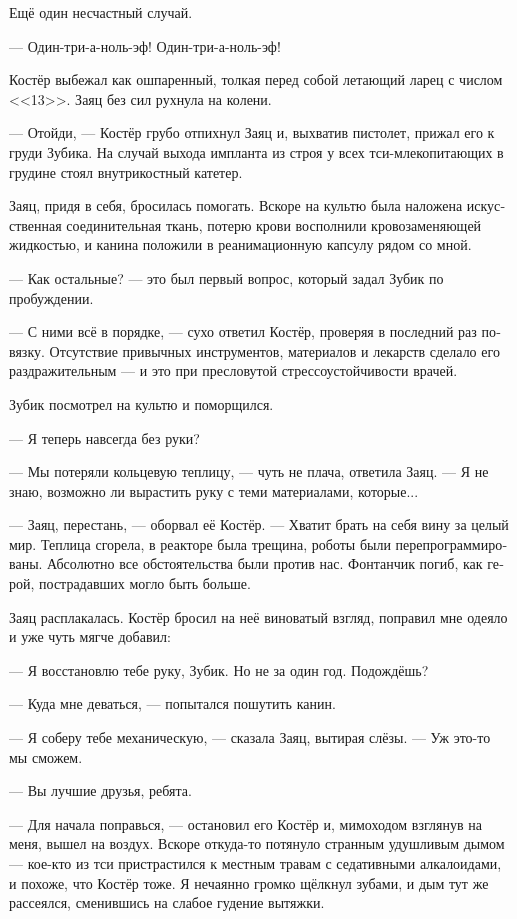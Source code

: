 \documentclass[a4paper,12pt,fleqn]{book}\usepackage{polyglossia}\setdefaultlanguage[babelshorthands=true]{russian}\setotherlanguage{english}\defaultfontfeatures{Ligatures=TeX,Mapping=tex-text}\usepackage{xcolor}\newcommand{\ml}[3]{#2}
\begin{document}
{Ещё один несчастный случай.

--- Один-три-а-ноль-эф!
Один-три-а-ноль-эф!

Костёр выбежал как ошпаренный, толкая перед собой летающий ларец с числом <<13>>.
Заяц без сил рухнула на колени.

--- Отойди, --- Костёр грубо отпихнул Заяц и, выхватив пистолет, прижал его к груди Зубика.
На случай выхода импланта из строя у всех тси-млекопитающих в грудине стоял внутрикостный катетер.

Заяц, придя в себя, бросилась помогать.
Вскоре на культю была наложена искусственная соединительная ткань, потерю крови восполнили кровозаменяющей жидкостью, и канина положили в реанимационную капсулу рядом со мной.

--- Как остальные? --- это был первый вопрос, который задал Зубик по пробуждении.

--- С ними всё в порядке, --- сухо ответил Костёр, проверяя в последний раз повязку.
Отсутствие привычных инструментов, материалов и лекарств сделало его раздражительным --- и это при пресловутой стрессоустойчивости врачей.

Зубик посмотрел на культю и поморщился.

--- Я теперь навсегда без руки?

--- Мы потеряли кольцевую теплицу, --- чуть не плача, ответила Заяц.
--- Я не знаю, возможно ли вырастить руку с теми материалами, которые...

--- Заяц, перестань, --- оборвал её Костёр.
--- Хватит брать на себя вину за целый мир.
Теплица сгорела, в реакторе была трещина, роботы были перепрограммированы.
Абсолютно все обстоятельства были против нас.
Фонтанчик погиб, как герой, пострадавших могло быть больше.

Заяц расплакалась.
Костёр бросил на неё виноватый взгляд, поправил мне одеяло и уже чуть мягче добавил:

--- Я восстановлю тебе руку, Зубик.
Но не за один год.
Подождёшь?

--- Куда мне деваться, --- попытался пошутить канин.

--- Я соберу тебе механическую, --- сказала Заяц, вытирая слёзы.
--- Уж это-то мы сможем.

--- Вы лучшие друзья, ребята.

--- Для начала поправься, --- остановил его Костёр и, мимоходом взглянув на меня, вышел на воздух.
Вскоре откуда-то потянуло странным удушливым дымом --- кое-кто из тси пристрастился к местным травам с седативными алкалоидами, и похоже, что Костёр тоже.
Я нечаянно громко щёлкнул зубами, и дым тут же рассеялся, сменившись на слабое гудение вытяжки.

}
\end{document}
